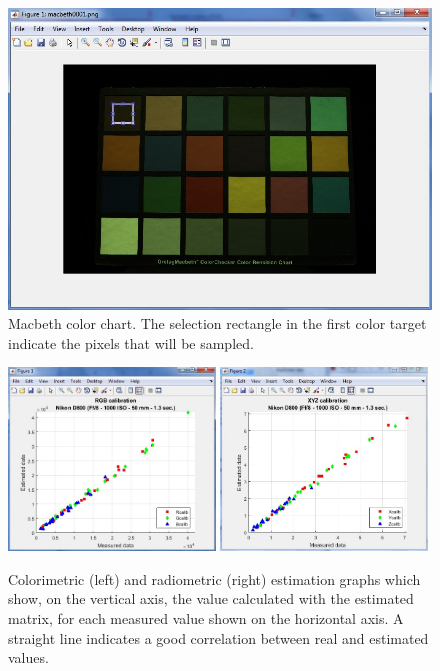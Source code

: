 \documentclass[a4paper,12pt,oneside]{article}
\begin{document}
\begin{figure}[hp]
	\centering
	\includegraphics[width=1\textwidth]{images/color_chart.jpg}
	\caption{Macbeth color chart. The selection rectangle in the first color target indicate the pixels that will be sampled.}
	\label{fig:color_chart}
\end{figure}

\begin{figure}[hp]
	\centering
	\includegraphics[width=0.49\textwidth]{images/graph1.jpg}
	\includegraphics[width=0.49\textwidth]{images/graph2.jpg}
	\caption{Colorimetric (left) and radiometric (right) estimation graphs which show, on the vertical axis, the value calculated with the estimated matrix, for each measured value shown on the horizontal axis. A straight line indicates a good correlation between real and estimated values.}
	\label{fig:estimated_graphs}
\end{figure}
\end{document}
